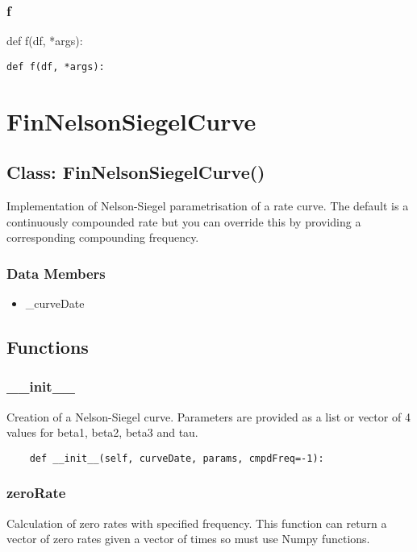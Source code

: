 \documentclass[twoside,11pt]{book}
\begin{document}
\subsubsection*{{\bf f}}
def f(df, *args): 

\begin{lstlisting}
def f(df, *args):
\end{lstlisting}

\newpage
\section{FinNelsonSiegelCurve}

\subsection*{Class: FinNelsonSiegelCurve()}
Implementation of Nelson-Siegel parametrisation of a rate curve.  The default is a continuously compounded rate but you can override  this by providing a corresponding compounding frequency.  

\subsubsection*{Data Members}
\begin{itemize}
\item{\_curveDate}
\end{itemize}

\subsection*{Functions}

\subsubsection*{{\bf \_\_init\_\_}}
Creation of a Nelson-Siegel curve. Parameters are provided as a  list or vector of 4 values for beta1, beta2, beta3 and tau.  

\begin{lstlisting}
    def __init__(self, curveDate, params, cmpdFreq=-1):
\end{lstlisting}

\subsubsection*{{\bf zeroRate}}
Calculation of zero rates with specified frequency. This  function can return a vector of zero rates given a vector of  times so must use Numpy functions.  
\end{document}
